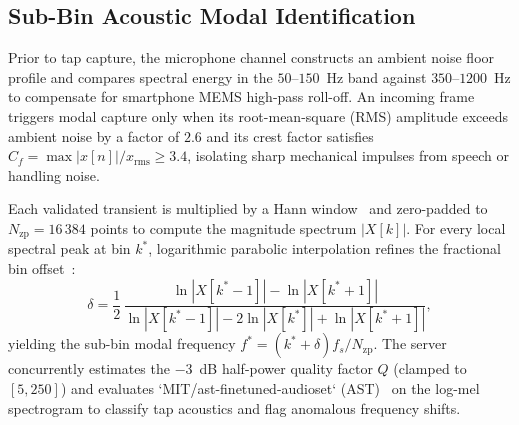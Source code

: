 \documentclass[journal]{IEEEtran}
\begin{document}
\subsection{Sub-Bin Acoustic Modal Identification}
Prior to tap capture, the microphone channel constructs an ambient noise floor profile and compares spectral energy in the $50\text{--}150$~Hz band against $350\text{--}1200$~Hz to compensate for smartphone MEMS high-pass roll-off. An incoming frame triggers modal capture only when its root-mean-square (RMS) amplitude exceeds ambient noise by a factor of $2.6$ and its crest factor satisfies $C_f = \max |x[n]| / x_{\mathrm{rms}} \ge 3.4$, isolating sharp mechanical impulses from speech or handling noise.

Each validated transient is multiplied by a Hann window~\cite{harris1978windows} and zero-padded to $N_{\mathrm{zp}} = 16\,384$ points to compute the magnitude spectrum $|X[k]|$. For every local spectral peak at bin $k^*$, logarithmic parabolic interpolation refines the fractional bin offset~\cite{smith1987parshl}:
\begin{equation}
\delta = \frac{1}{2}\, \frac{\ln|X[k^*-1]| - \ln|X[k^*+1]|}{\ln|X[k^*-1]| - 2\ln|X[k^*]| + \ln|X[k^*+1]|},
\label{eq:parabolic}
\end{equation}
yielding the sub-bin modal frequency $f^* = (k^* + \delta) f_s / N_{\mathrm{zp}}$. The server concurrently estimates the $-3$~dB half-power quality factor $Q$ (clamped to $[5, 250]$) and evaluates `MIT/ast-finetuned-audioset` (AST)~\cite{gong2021ast} on the log-mel spectrogram to classify tap acoustics and flag anomalous frequency shifts.
\end{document}
